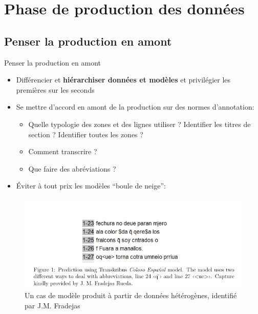 \documentclass[11pt,aspectratio=169]{beamer}
\let\cite\parencite
\begin{document}
\section{Phase de production des données}

\subsection{Penser la production en amont}

\begin{frame}{Penser la production en amont}
\begin{itemize}
\item Différencier et \textbf{hiérarchiser données et modèles} et privilégier les premières sur les seconds
\pause\item Se mettre d'accord en amont de la production sur des normes d'annotation:

	\begin{itemize}
	\pause\item Quelle typologie des zones et des lignes utiliser ? Identifier les titres de section ? Identifier toutes les zones ?
	\pause\item Comment transcrire ?
	\pause\item Que faire des abréviations ?
	\end{itemize}
	\pause\item Éviter à tout prix les modèles \enquote{boule de neige}:
\end{itemize}
\pause\begin{figure}
    \centering
    \includegraphics[width=.6\textwidth, trim={0 3.2cm 0 2cm},clip]{img/snowball.png}
    \caption{Un cas de modèle produit à partir de données hétérogènes, identifié par J.M. Fradejas \cite{pinche_CATMuSMedievalConsistentApproaches_2024}}
    \label{fig:coloseo}
\end{figure}
\end{frame}
\end{document}
